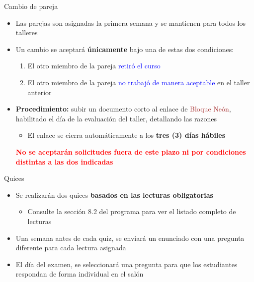 \documentclass[10pt, xcolor=dvipsnames]{beamer}
\begin{document}
\begin{frame}{Cambio de pareja}
\begin{itemize}
    \item Las parejas son asignadas la primera semana y se mantienen para todos los talleres%
    \item Un cambio se aceptará \textbf{únicamente} bajo una de estas dos condiciones:
    \begin{enumerate}
        \item[(i)] El otro miembro de la pareja \textcolor{blue}{retiró el curso}
        \item[(ii)] El otro miembro de la pareja \textcolor{blue}{no trabajó de manera aceptable} en el taller anterior%
    \end{enumerate}
    \item \textbf{Procedimiento:} subir un documento corto al enlace de \textcolor{brown}{Bloque Neón}, habilitado el día de la evaluación del taller, detallando las razones
    \begin{itemize}
        \item El enlace se cierra automáticamente a los \textbf{tres (3) días hábiles}
    \end{itemize}
    \begin{tcolorbox}[colback=gray!10, breakable]
        \textbf{\textcolor{red}{No se aceptarán solicitudes fuera de este plazo ni por condiciones distintas a las dos indicadas}}
    \end{tcolorbox}
\end{itemize}
\end{frame}


\begin{frame}{Quices}
\begin{itemize}
    \item Se realizarán dos quices \textbf{basados en las lecturas obligatorias}
    \begin{itemize}
        \item Consulte la sección 8.2 del programa para ver el listado completo de lecturas
    \end{itemize}
    \item Una semana antes de cada quiz, se enviará un enunciado con una pregunta diferente para cada lectura asignada
    \item El día del examen, se seleccionará una pregunta para que los estudiantes respondan de forma individual en el salón
\end{itemize}
\end{frame}
\end{document}
